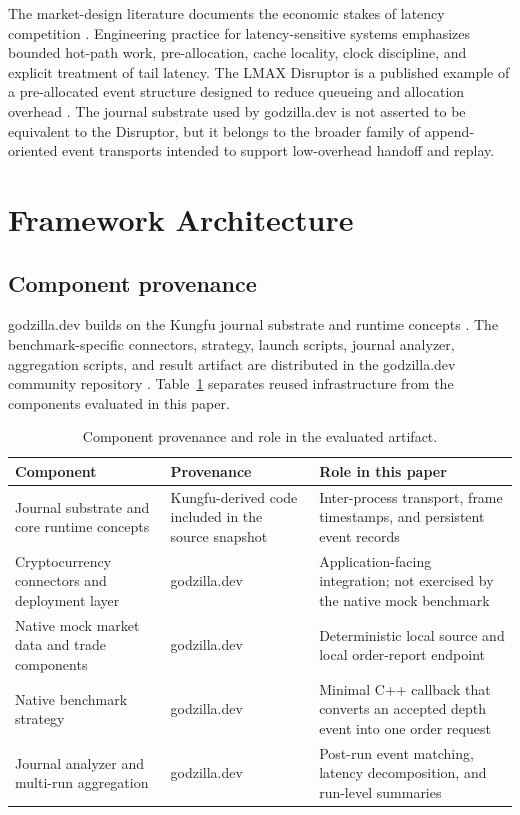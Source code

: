 \documentclass[11pt]{article}
\newcommand{\framework}{godzilla.dev}
\begin{document}
The market-design literature documents the economic stakes of latency competition \cite{budish2015armsrace}. Engineering practice for latency-sensitive systems emphasizes bounded hot-path work, pre-allocation, cache locality, clock discipline, and explicit treatment of tail latency. The LMAX Disruptor is a published example of a pre-allocated event structure designed to reduce queueing and allocation overhead \cite{thompson2011disruptor}. The journal substrate used by \framework{} is not asserted to be equivalent to the Disruptor, but it belongs to the broader family of append-oriented event transports intended to support low-overhead handoff and replay.

\section{Framework Architecture}

\subsection{Component provenance}

\framework{} builds on the Kungfu journal substrate and runtime concepts \cite{kungfu2026}. The benchmark-specific connectors, strategy, launch scripts, journal analyzer, aggregation scripts, and result artifact are distributed in the \framework{} community repository \cite{godzillaartifact2026}. Table~\ref{tab:provenance} separates reused infrastructure from the components evaluated in this paper.

\begin{table}[ht]
\centering
\caption{Component provenance and role in the evaluated artifact.}
\label{tab:provenance}
\small
\begin{tabularx}{\textwidth}{@{}p{}p{}X@{}}
\toprule
Component & Provenance & Role in this paper \\
\midrule
Journal substrate and core runtime concepts & Kungfu-derived code included in the source snapshot & Inter-process transport, frame timestamps, and persistent event records \\
Cryptocurrency connectors and deployment layer & \framework{} & Application-facing integration; not exercised by the native mock benchmark \\
Native mock market data and trade components & \framework{} & Deterministic local source and local order-report endpoint \\
Native benchmark strategy & \framework{} & Minimal C++ callback that converts an accepted depth event into one order request \\
Journal analyzer and multi-run aggregation & \framework{} & Post-run event matching, latency decomposition, and run-level summaries \\
\bottomrule
\end{tabularx}
\end{table}
\end{document}

